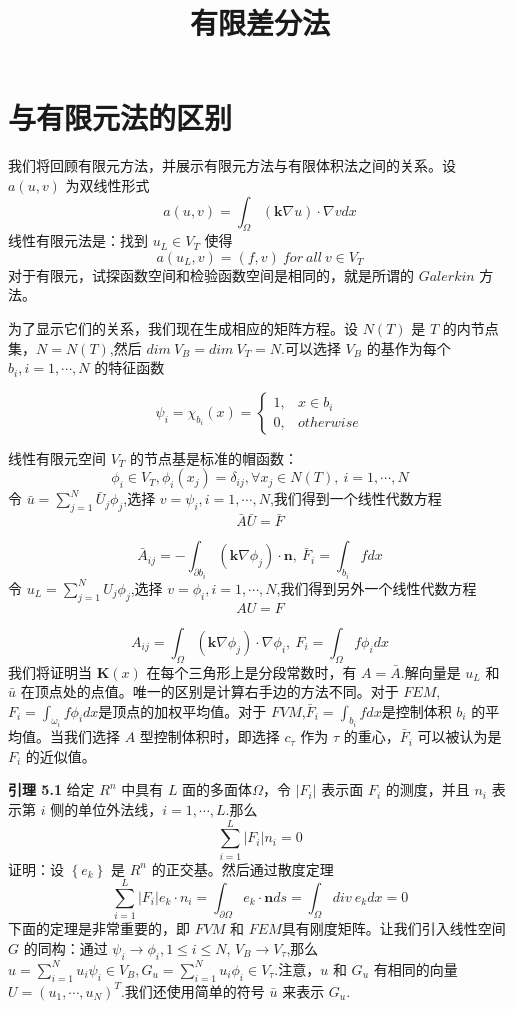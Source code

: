\documentclass[12pt,a4paper]{article}
\title{有限差分法}
\date{\chntoday}
\begin{document}
\section{与有限元法的区别}
我们将回顾有限元方法，并展示有限元方法与有限体积法之间的关系。设 $a(u,v)$ 为双线性形式
$$
a(u,v)=\int_{\Omega}^{} (\textbf{k}\nabla u)\cdot\nabla v dx
$$
线性有限元法是：找到 $u_{L}\in V_T$ 使得
$$
a(u_L,v)=(f,v) ~ for ~ all ~ v\in V_T
$$
对于有限元，试探函数空间和检验函数空间是相同的，就是所谓的 $Galerkin$ 方法。

为了显示它们的关系，我们现在生成相应的矩阵方程。设 $N(T)$ 是 $T$ 的内节点集，$N=N(T)$,然后 $dim ~ V_B=dim ~ V_T=N$.可以选择 $V_B$ 的基作为每个 $b_i,i=1,\cdots ,N$ 的特征函数

$$
\psi _i=\chi _{b_i}(x)=
\begin{cases}
1, & x\in b_i \\
0, & otherwise
\end{cases}
$$

线性有限元空间 $V_T$ 的节点基是标准的帽函数：
$$
\phi _i\in V_T,\phi _i(x_j)=\delta_{ij},\forall x_j\in N(T),~i=1,\cdots ,N
$$
令 $\bar{u}=\sum_{j=1}^N \bar{U}_j\phi_j$,选择 $v=\psi_i,i=1,\cdots ,N$,我们得到一个线性代数方程
$$
\bar{A}\bar{U}=\bar{F}
$$

$$
\bar{A}_{ij}=-\int_{\partial b_i}^{}(\textbf{k}\nabla \phi_j)\cdot\textbf{n},~\bar{F}_i=\int_{b_i}^{} fdx
$$
令 $u_L=\sum_{j=1}^N U_j\phi_j$,选择 $v=\phi_i,i=1,\cdots ,N$,我们得到另外一个线性代数方程
$$
AU=F
$$

$$
A_{ij}=\int_{\Omega}^{}(\textbf{k}\nabla \phi_j)\cdot\nabla \phi_i,~F_i=\int_{\Omega}^{} f\phi_i dx
$$
我们将证明当 $\textbf{K}(x)$ 在每个三角形上是分段常数时，有 $A=\bar{A}$.解向量是 $u_L$ 和 $\bar{u}$ 在顶点处的点值。唯一的区别是计算右手边的方法不同。对于 $FEM$,$F_i=\int_{\omega_i}^{}f\phi_i dx$是顶点的加权平均值。对于 $FVM$,$\bar{F}_i=\int_{b_i}^{}fdx$是控制体积 $b_i$ 的平均值。当我们选择 $A$ 型控制体积时，即选择 $c_{\tau}$ 作为 $\tau$ 的重心，$\bar{F}_i$ 可以被认为是 $F_i$ 的近似值。

\textbf{引理 5.1}
给定 $R^n$ 中具有 $L$ 面的多面体$\Omega$，令 $|F_i|$ 表示面 $F_i$ 的测度，并且 $n_i$ 表示第 $i$ 侧的单位外法线，$i=1,\cdots ,L$.那么
$$
\sum_{i=1}^L |F_i| {n}_i=0
$$
证明：设 $\left\{e_k\right\}$ 是 $R^n$ 的正交基。然后通过散度定理
$$
\sum_{i=1}^L |F_i| e_k\cdot {n}_i=\int_{\partial\Omega}^{} e_k\cdot\textbf{n}ds=\int_{\Omega}^{}div ~ e_k dx=0
$$
下面的定理是非常重要的，即 $FVM$ 和 $FEM$具有刚度矩阵。让我们引入线性空间 $G$ 的同构：通过 $\psi _i\to\phi _i,1\le i\le N$, $V_B\to V_{\tau}$,那么 $u=\sum_{i=1}^N u_i\psi _i\in V_B,G_u=\sum_{i=1}^N u_i\phi _i\in V_{\tau}$.注意，$u$ 和 $G_u$ 有相同的向量 $U=(u_1,\cdots,u_N)^T$.我们还使用简单的符号 $\bar{u}$ 来表示 $G_u$.
\end{document}
